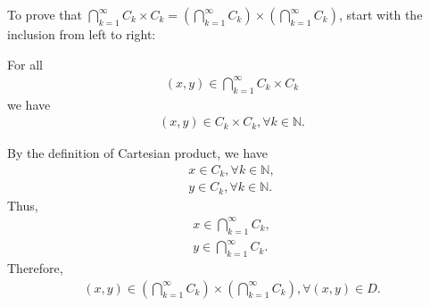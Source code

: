 \documentclass[UTF8,a4paper,10pt]{article}
\begin{document}
\begin{solution}
    To prove that \(\bigcap_{k=1}^{\infty} C_k \times C_k = \left(\bigcap_{k=1}^{\infty} C_k\right) \times \left(\bigcap_{k=1}^{\infty} C_k\right) \), start with the inclusion from left to right:

For all
    \begin{equation*}
      \begin{aligned}
          (x,y)\in\bigcap_{k=1}^{\infty} C_k \times C_k
      \end{aligned}
    \end{equation*}
    we have
    \begin{equation*}
      \begin{aligned}
        (x,y)\in C_k \times C_k, \forall k \in \mathbb{N}.
      \end{aligned}
    \end{equation*}

    By the definition of Cartesian product, we have
    \begin{equation*}
      \begin{aligned}
        x\in C_k, \forall k \in \mathbb{N},\\
        y\in C_k, \forall k \in \mathbb{N}.
      \end{aligned}
    \end{equation*}
    Thus,
    \begin{equation*}
      \begin{aligned}
        x\in \bigcap_{k=1}^{\infty} C_k,\\
        y\in \bigcap_{k=1}^{\infty} C_k.
      \end{aligned}
    \end{equation*}
    Therefore,
    \begin{equation*}
      \begin{aligned}
        (x,y)\in \left(\bigcap_{k=1}^{\infty} C_k\right) \times \left(\bigcap_{k=1}^{\infty} C_k\right),\forall (x,y)\in D.
      \end{aligned}
    \end{equation*}


\end{solution}
\end{document}
